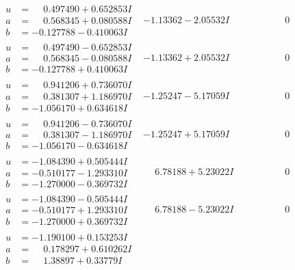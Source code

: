\documentclass[1p]{elsarticle_modified}
\theoremstyle{definition}
\begin{document}
$$\begin{array}{c|c|c}
\begin{aligned}
u &= \phantom{-}0.497490 + 0.652853 I \\
a &= \phantom{-}0.568345 + 0.080588 I \\
b &= -0.127788 - 0.410063 I\end{aligned}
 & -1.13362 - 2.05532 I & \phantom{-0.000000 } 0 \\ \hline\begin{aligned}
u &= \phantom{-}0.497490 - 0.652853 I \\
a &= \phantom{-}0.568345 - 0.080588 I \\
b &= -0.127788 + 0.410063 I\end{aligned}
 & -1.13362 + 2.05532 I & \phantom{-0.000000 } 0 \\ \hline\begin{aligned}
u &= \phantom{-}0.941206 + 0.736070 I \\
a &= \phantom{-}0.381307 + 1.186970 I \\
b &= -1.056170 + 0.634618 I\end{aligned}
 & -1.25247 - 5.17059 I & \phantom{-0.000000 } 0 \\ \hline\begin{aligned}
u &= \phantom{-}0.941206 - 0.736070 I \\
a &= \phantom{-}0.381307 - 1.186970 I \\
b &= -1.056170 - 0.634618 I\end{aligned}
 & -1.25247 + 5.17059 I & \phantom{-0.000000 } 0 \\ \hline\begin{aligned}
u &= -1.084390 + 0.505444 I \\
a &= -0.510177 - 1.293310 I \\
b &= -1.270000 - 0.369732 I\end{aligned}
 & \phantom{-}6.78188 + 5.23022 I & \phantom{-0.000000 } 0 \\ \hline\begin{aligned}
u &= -1.084390 - 0.505444 I \\
a &= -0.510177 + 1.293310 I \\
b &= -1.270000 + 0.369732 I\end{aligned}
 & \phantom{-}6.78188 - 5.23022 I & \phantom{-0.000000 } 0 \\ \hline\begin{aligned}
u &= -1.190100 + 0.153253 I \\
a &= \phantom{-}0.178297 + 0.610262 I \\
b &= \phantom{-}1.38897 + 0.33779 I\end{aligned}

\end{array}$$
\end{document}
